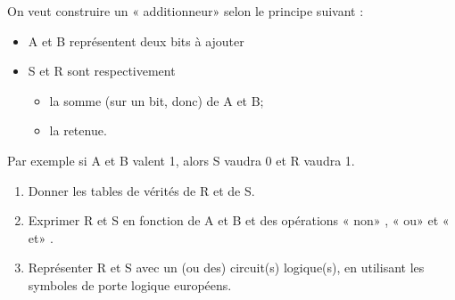 \begin{exercice}[]
    On veut construire un « additionneur»  selon le principe suivant :
    \begin{itemize}
        \item 	A et B représentent deux bits à ajouter
        \item 	S et R sont respectivement
              \begin{itemize}
                  \item 	la somme (sur un bit, donc) de A et B;
                  \item 	la retenue.
              \end{itemize}
    \end{itemize}
    Par exemple si A et B valent 1, alors S vaudra 0 et R vaudra 1.
    \begin{enumerate}
        \item 	Donner les tables de vérités de R et de S.
        \item 	Exprimer R et S en fonction de A et B et des opérations « non» , « ou»  et « et» .
        \item 	Représenter R et S avec un (ou des) circuit(s) logique(s), en utilisant les symboles de porte logique européens.
    \end{enumerate}
\end{exercice}

